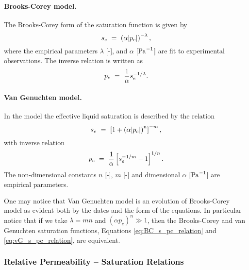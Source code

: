 \paragraph{Brooks-Corey model.}
The Brooks-Corey form of the saturation function \citep{brooks1964hydraulic} is given by
\begin{equation}
  \label{eq:BC_s_pc_relation}
  s_e \ =\  \left( \alpha |p_c| \right)^{-\lambda}, 
\end{equation}
where the empirical parameters $\lambda$ [-], and $\alpha$ [${\rm Pa}^{-1}$] 
are fit to experimental observations.
The inverse relation is written as
\begin{equation}
  \label{eq:BC_pc_s_relation}
  p_c \ =\  \frac{1}{\alpha} s_e^{-1/\lambda}.
\end{equation}

\paragraph{Van Genuchten model.}
In the \citet{van1980closed} model the effective liquid saturation is
described by the relation
%
\begin{equation}  
  \label{eq:vG_s_pc_relation}
  s_e \ =\  \left[1+\left( \alpha |p_c| \right)^n \right]^{-m}, 
\end{equation}
%
with inverse relation
\begin{equation}
  \label{eq:vG_pc_s_relation}
  p_c \ =\  \frac{1}{\alpha} \left[ s_e^{-1/m} -1 \right]^{1/n}.
\end{equation}
%
The non-dimensional constants $n$ [-], $m$ [-] and dimensional $\alpha$ [${\rm Pa}^{-1}$] are
empirical parameters.


One may notice that Van Genuchten model is an evolution of Brooks-Corey model as evident 
both by the dates and the form of the equations.
In particular notice that if we take 
$\lambda = mn$ and $(\alpha p_c)^n \gg 1$, 
then the Brooks-Corey and van Genuchten saturation functions, 
Equations \eqref{eq:BC_s_pc_relation} and \eqref{eq:vG_s_pc_relation}, are equivalent.


\subsubsection{Relative Permeability -- Saturation Relations}
\label{sec:richards-relative-permeability}

